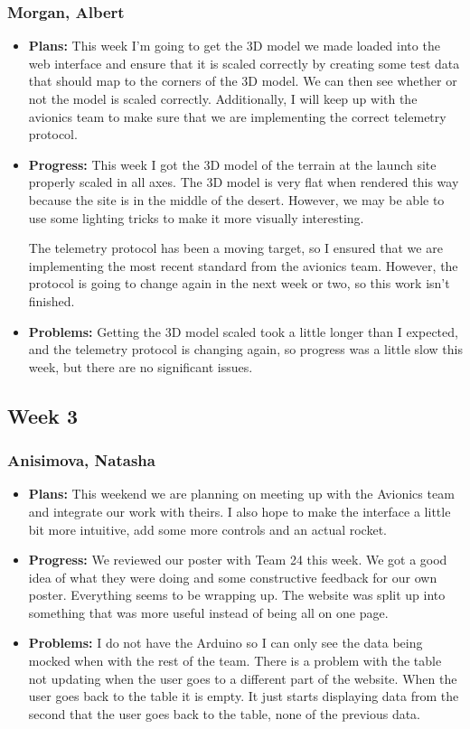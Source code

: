 \documentclass[10pt,draftclsnofoot,onecolumn]{IEEEtran}
\begin{document}
\subsubsection{Morgan, Albert}
\begin{itemize}
	\item \textbf{Plans: }
	This week I'm going to get the 3D model we made loaded into the web interface and ensure that it is scaled correctly by creating some test data that should map to the corners of the 3D model. We can then see whether or not the model is scaled correctly. Additionally, I will keep up with the avionics team to make sure that we are implementing the correct telemetry protocol.
	\item \textbf{Progress: }
	This week I got the 3D model of the terrain at the launch site properly scaled in all axes. The 3D model is very flat when rendered this way because the site is in the middle of the desert. However, we may be able to use some lighting tricks to make it more visually interesting.

	The telemetry protocol has been a moving target, so I ensured that we are implementing the most recent standard from the avionics team. However, the protocol is going to change again in the next week or two, so this work isn't finished.
	\item \textbf{Problems: }
	Getting the 3D model scaled took a little longer than I expected, and the telemetry protocol is changing again, so progress was a little slow this week, but there are no significant issues.
\end{itemize}

\subsection{Week 3}
\subsubsection{Anisimova, Natasha}
\begin{itemize}
	\item \textbf{Plans: }
	This weekend we are planning on meeting up with the Avionics team and integrate our work with theirs. I also hope to make the interface a little bit more intuitive, add some more controls and an actual rocket.
	\item \textbf{Progress:  }
	We reviewed our poster with Team 24 this week. We got a good idea of what they were doing and some constructive feedback for our own poster. Everything seems to be wrapping up. The website was split up into something that was more useful instead of being all on one page.
	\item \textbf{Problems: }
	I do not have the Arduino so I can only see the data being mocked when with the rest of the team. There is a problem with the table not updating when the user goes to a different part of the website. When the user goes back to the table it is empty. It just starts displaying data from the second that the user goes back to the table, none of the previous data.
\end{itemize}
\end{document}
